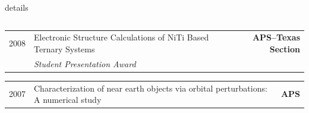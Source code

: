 \documentclass[10pt,letterpaper]{moderncv}
\begin{document}
\begin{taggedblock}{details}
\begin{tabularx}{\textwidth}{p{.33in}>{\raggedright\arraybackslash}X>{\bfseries}r}
\end{tabularx}

\begin{tabularx}{\textwidth}{p{.33in}>{\raggedright\arraybackslash}X>{\bfseries}r}
     2008 & Electronic Structure Calculations of NiTi Based Ternary Systems  & APS--Texas Section \\
     & \emph{Student Presentation Award} & \\

\end{tabularx}

\begin{tabularx}{\textwidth}{p{.33in}>{\raggedright\arraybackslash}X>{\bfseries}r}
     2007 & Characterization of near earth objects via orbital perturbations: A numerical study & APS

\end{tabularx}
\end{taggedblock}




\end{document}
